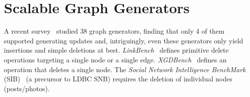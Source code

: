 \section{Scalable Graph Generators}


A recent survey~\cite{DBLP:journals/csur/BonifatiHPS20} studied 38 graph generators, finding that only 4 of them supported generating updates and, intriguingly, even these generators only yield insertions and simple deletions at best.
\emph{LinkBench}~\cite{DBLP:conf/sigmod/ArmstrongPBC13} defines primitive delete operations targeting a single node or a single edge.
\emph{XGDBench}~\cite{DBLP:journals/ase/DayarathnaS14} defines an operation that deletes a single node.
The \emph{Social Network Intelligence BenchMark} (SIB)~\cite{SIB} (a precursor to LDBC SNB) requires the deletion of individual nodes (posts/photos).
